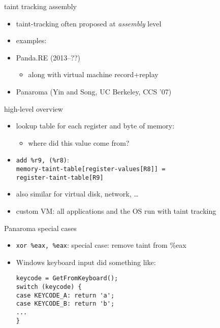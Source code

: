 \begin{frame}{taint tracking assembly}
\begin{itemize}
\item taint-tracking often proposed at \textit{assembly} level
\item examples:
\vspace{.5cm}
\item Panda.RE (2013--??)
    \begin{itemize}
    \item along with virtual machine record+replay
    \end{itemize}
\item Panaroma (Yin and Song, UC Berkeley, CCS '07)
\end{itemize}
\end{frame}

\begin{frame}{high-level overview}
\begin{itemize}
\item lookup table for each register and byte of memory:
    \begin{itemize}
    \item where did this value come from?
    \end{itemize}
\item \texttt{add \%r9, (\%r8)}: \\
    \texttt{memory-taint-table[register-values[R8]] =} \\
    \hspace{4cm} \texttt{register-taint-table[R9]}
\item also similar for virtual disk, network, \ldots
\item custom VM: all applications and the OS run with taint tracking
\end{itemize}
\end{frame}

\begin{frame}[fragile,label=panaromaSpecial]{Panaroma special cases}
\begin{itemize}
\item \texttt{xor \%eax, \%eax}: special case: remove taint from \%eax
\item Windows keyboard input did something like:
\begin{lstlisting}
keycode = GetFromKeyboard();
switch (keycode) {
case KEYCODE_A: return 'a';
case KEYCODE_B: return 'b';
...
}
\end{lstlisting}
\end{itemize}
\end{frame}
